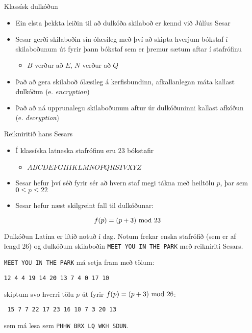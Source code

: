 \documentclass[handout]{beamer}
\begin{document}
\begin{frame}{Klassísk dulkóðun}
\begin{itemize}
 \item Ein elsta þekkta leiðin til að dulkóða skilaboð er kennd við Júlíus Sesar
 \item Sesar gerði skilaboðin sín ólæsileg með því að skipta hverjum bókstaf í skilaboðunum út fyrir þann bókstaf sem er þremur sætum aftar í stafrófinu
 \begin{itemize}
  \item $B$ verður að $E$, $N$ verður að $Q$
 \end{itemize}
 \item Það að gera skilaboð ólæsileg á kerfisbundinn, afkallanlegan máta kallast dulkóðun (e. \emph{encryption})
 \item Það að ná upprunalegu skilaboðunum aftur úr dulkóðuninni kallast afkóðun (e. \emph{decryption})
\end{itemize}
\end{frame}

\begin{frame}{Reikniritið hans Sesars}
\begin{itemize}
 \item Í klassíska latneska stafrófinu eru 23 bókstafir
 \begin{itemize}
  \item $A	B	C	D	E	F	G	H	 I	K	L	M	N	O	P	Q	R	S	T	V	X	Y	Z$
 \end{itemize}
 \item Sesar hefur því séð fyrir sér að hvern staf megi tákna með heiltölu $p$, þar sem $0 \leq p \leq 22$
 \item Sesar hefur næst skilgreint fall til dulkóðunar:
\end{itemize}
\[
 f(p) = (p + 3) \ \text{mod}\ 23
\]
\end{frame}

\begin{frame}{Dulkóðun}
Latína er lítið notuð í dag. Notum frekar enska stafrófið (sem er af lengd 26) og dulkóðum skilaboðin \texttt{MEET YOU IN THE PARK} með reikniriti Sesars. \pause

\texttt{MEET YOU IN THE PARK} má setja fram með tölum:
\begin{center}
\texttt{12 4 4 19 14 20 13 7 4 0 17 10}
\end{center}\pause
skiptum svo hverri tölu $p$ út fyrir $f(p) = (p+3) \ \text{mod}\ 26$:
\begin{center}
\texttt{
15 7 7 22 17 23 16 10 7 3 20 13}
\end{center}
sem má lesa sem \texttt{PHHW BRX LQ WKH SDUN}.
\end{frame}
\end{document}
